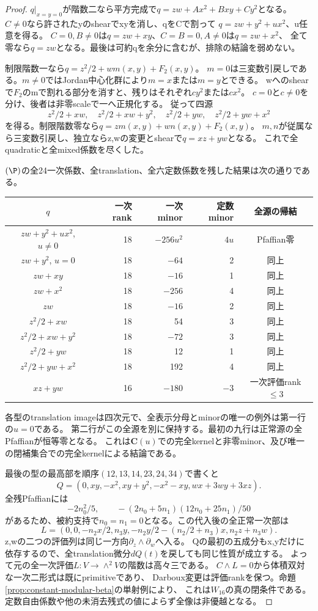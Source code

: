 \documentclass[a4paper,11pt]{ltjsarticle}
\theoremstyle{definition}
\newcommand{\CC}{\mathbf C}
\begin{document}
\begin{proof}
$q|_{x=y=0}$が階数二なら平方完成で$q=zw+Ax^2+Bxy+Cy^2$となる。
$C\ne0$なら許されたyのshearでxyを消し、qをCで割って
$q=zw+y^2+u x^2$、u任意を得る。
$C=0,B\ne0$は$q=zw+xy$、$C=B=0,A\ne0$は$q=zw+x^2$、
全て零なら$q=zw$となる。最後は可約qを余分に含むが、排除の結論を弱めない。

制限階数一なら$q=z^2/2+w m(x,y)+F_2(x,y)$。
$m=0$は三変数引戻しである。$m\ne0$ではJordan中心化群により$m=x$または$m=y$とできる。
wへのshearで$F_2$のmで割れる部分を消すと、残りはそれぞれ$cy^2$または$cx^2$。
$c=0$と$c\ne0$を分け、後者は非零scaleで一へ正規化する。
従って四源
\[
 z^2/2+xw,\quad z^2/2+xw+y^2,\quad z^2/2+yw,\quad z^2/2+yw+x^2
\]
を得る。制限階数零なら$q=z m(x,y)+w n(x,y)+F_2(x,y)$。
$m,n$が従属なら三変数引戻し、独立ならz,wの変更とshearで$q=xz+yw$となる。
これで全quadraticと全mixed係数を尽くした。

$(\P)$の全24一次係数、全translation、全六定数係数を残した結果は次の通りである。
\begin{center}\small
\begin{tabular}{c|r|r|r|c}
$q$&一次rank&一次minor&定数minor&全源の帰結\\\hline
$zw+y^2+u x^2$, $u\ne0$&18&$-256u^2$&$4u$&Pfaffian零\\
$zw+y^2$, $u=0$&18&$-64$&2&同上\\
$zw+xy$&18&$-16$&1&同上\\
$zw+x^2$&18&$-256$&4&同上\\
$zw$&18&$-16$&2&同上\\
$z^2/2+xw$&18&54&3&同上\\
$z^2/2+xw+y^2$&18&$-72$&3&同上\\
$z^2/2+yw$&18&12&1&同上\\
$z^2/2+yw+x^2$&18&192&4&同上\\
$xz+yw$&16&$-180$&$-3$&一次評価rank$\le3$
\end{tabular}
\end{center}
各型のtranslation imageは四次元で、全表示分母とminorの唯一の例外は第一行の$u=0$である。
第二行がこの全源を別に保持する。最初の九行は正常源の全Pfaffianが恒等零となる。
これは$\CC(u)$での完全kernelと非零minor、及び唯一の閉補集合での完全kernelによる結論である。

最後の型の最高部を順序$(12,13,14,23,24,34)$で書くと
\[
 Q=(0,xy,-x^2,xy+y^2,-x^2-xy,wx+3wy+3xz).
\]
全残Pfaffianには
\[
 -2n_0^2/5,\qquad -(2n_0+5n_1)(12n_0+25n_1)/50
\]
があるため、被約支持で$n_0=n_1=0$となる。この代入後の全正常一次部は
\[
 L=(0,0,-n_2x/2,n_3y,-n_2y/2-(n_2/2+n_3)x,n_2z+n_3w).
\]
z,wの二つの評価列は同じ一方向$\partial_z\wedge\partial_w$へ入る。
Qの最初の五成分もx,yだけに依存するので、全translation微分$dQ(t)$を戻しても同じ性質が成立する。
よって元の全一次評価$L:V\to\wedge^2V$の階数は高々三である。
$C\wedge L=0$から体積双対な一次二形式は既にprimitiveであり、
Darboux変更は評価rankを保つ。命題\ref{prop:constant-modular-beta}の単射例により、
これは$W_{16}$の真の閉条件である。定数自由係数や他の未消去残式の値によらず全像は非優越となる。
\end{proof}
\end{document}
